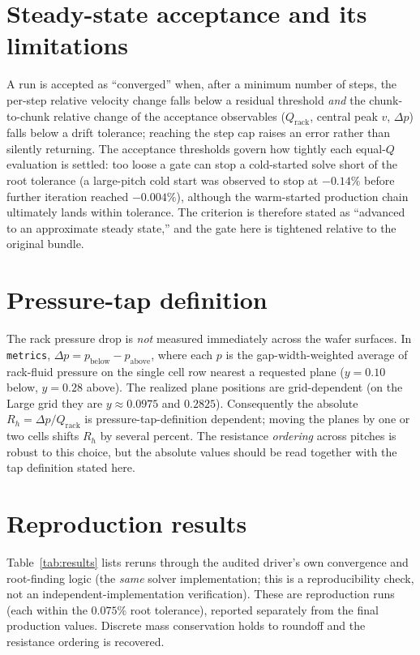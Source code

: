 \documentclass[11pt]{article}
\begin{document}
\section{Steady-state acceptance and its limitations}\label{sec:conv}
A run is accepted as ``converged'' when, after a minimum number of steps, the
per-step relative velocity change falls below a residual threshold \emph{and}
the chunk-to-chunk relative change of the acceptance observables
($Q_\mathrm{rack}$, central peak $v$, $\Delta p$) falls below a drift tolerance;
reaching the step cap raises an error rather than silently returning. The
acceptance thresholds govern how tightly each equal-$Q$ evaluation is settled:
too loose a gate can stop a cold-started solve short of the root tolerance (a
large-pitch cold start was observed to stop at $-0.14\%$ before further
iteration reached $-0.004\%$), although the warm-started production chain
ultimately lands within tolerance. The criterion is therefore stated as
``advanced to an approximate steady state,'' and the gate here is tightened
relative to the original bundle.

\section{Pressure-tap definition}\label{sec:taps}
The rack pressure drop is \emph{not} measured immediately across the wafer
surfaces. In \texttt{metrics}, $\Delta p = p_\mathrm{below}-p_\mathrm{above}$,
where each $p$ is the gap-width-weighted average of rack-fluid pressure on the
single cell row nearest a requested plane ($y=0.10$ below, $y=0.28$ above). The
realized plane positions are grid-dependent (on the Large grid they are
$y\approx0.0975$ and $0.2825$). Consequently the absolute $R_h=\Delta p/
Q_\mathrm{rack}$ is pressure-tap-definition dependent; moving the planes by one
or two cells shifts $R_h$ by several percent. The resistance \emph{ordering}
across pitches is robust to this choice, but the absolute values should be read
together with the tap definition stated here.

\section{Reproduction results}
Table~\ref{tab:results} lists reruns through the audited driver's
own convergence and root-finding logic (the \emph{same} solver implementation;
this is a reproducibility check, not an independent-implementation
verification). These are reproduction runs (each within
the $0.075\%$ root tolerance), reported separately from the final production
values. Discrete mass conservation holds to roundoff and the resistance ordering
is recovered.
\end{document}
